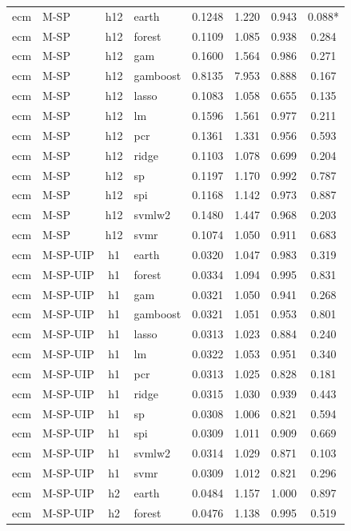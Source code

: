\begin{ThreePartTable}
\begin{longtable}[t]{llclcccc}
\addlinespace
ecm & M-SP & h12 & earth & 0.1248 & 1.220 & 0.943 & 0.088*\\
ecm & M-SP & h12 & forest & 0.1109 & 1.085 & 0.938 & 0.284\\
ecm & M-SP & h12 & gam & 0.1600 & 1.564 & 0.986 & 0.271\\
ecm & M-SP & h12 & gamboost & 0.8135 & 7.953 & 0.888 & 0.167\\
ecm & M-SP & h12 & lasso & 0.1083 & 1.058 & 0.655 & 0.135\\
ecm & M-SP & h12 & lm & 0.1596 & 1.561 & 0.977 & 0.211\\
ecm & M-SP & h12 & pcr & 0.1361 & 1.331 & 0.956 & 0.593\\
ecm & M-SP & h12 & ridge & 0.1103 & 1.078 & 0.699 & 0.204\\
ecm & M-SP & h12 & sp & 0.1197 & 1.170 & 0.992 & 0.787\\
ecm & M-SP & h12 & spi & 0.1168 & 1.142 & 0.973 & 0.887\\
ecm & M-SP & h12 & svmlw2 & 0.1480 & 1.447 & 0.968 & 0.203\\
ecm & M-SP & h12 & svmr & 0.1074 & 1.050 & 0.911 & 0.683\\
\addlinespace
ecm & M-SP-UIP & h1 & earth & 0.0320 & 1.047 & 0.983 & 0.319\\
ecm & M-SP-UIP & h1 & forest & 0.0334 & 1.094 & 0.995 & 0.831\\
ecm & M-SP-UIP & h1 & gam & 0.0321 & 1.050 & 0.941 & 0.268\\
ecm & M-SP-UIP & h1 & gamboost & 0.0321 & 1.051 & 0.953 & 0.801\\
ecm & M-SP-UIP & h1 & lasso & 0.0313 & 1.023 & 0.884 & 0.240\\
ecm & M-SP-UIP & h1 & lm & 0.0322 & 1.053 & 0.951 & 0.340\\
ecm & M-SP-UIP & h1 & pcr & 0.0313 & 1.025 & 0.828 & 0.181\\
ecm & M-SP-UIP & h1 & ridge & 0.0315 & 1.030 & 0.939 & 0.443\\
ecm & M-SP-UIP & h1 & sp & 0.0308 & 1.006 & 0.821 & 0.594\\
ecm & M-SP-UIP & h1 & spi & 0.0309 & 1.011 & 0.909 & 0.669\\
ecm & M-SP-UIP & h1 & svmlw2 & 0.0314 & 1.029 & 0.871 & 0.103\\
ecm & M-SP-UIP & h1 & svmr & 0.0309 & 1.012 & 0.821 & 0.296\\
\addlinespace
ecm & M-SP-UIP & h2 & earth & 0.0484 & 1.157 & 1.000 & 0.897\\
ecm & M-SP-UIP & h2 & forest & 0.0476 & 1.138 & 0.995 & 0.519\\

\end{longtable}
\end{ThreePartTable}
